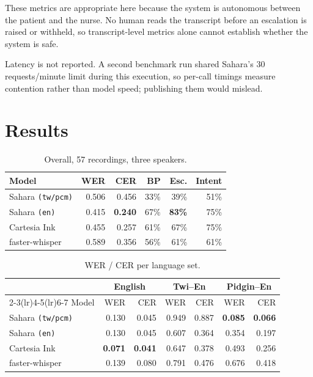 \documentclass[a4paper,10pt,twocolumn]{article}
\begin{document}
These metrics are appropriate here because the system is autonomous between the
patient and the nurse. No human reads the transcript before an escalation is
raised or withheld, so transcript-level metrics alone cannot establish whether
the system is safe.

Latency is not reported. A second benchmark run shared Sahara's
30\,requests/minute limit during this execution, so per-call timings measure
contention rather than model speed; publishing them would mislead.

\section{Results}

\begin{table}[t]
\centering\small
\caption{Overall, 57 recordings, three speakers.}
\label{tab:overall}
\setlength{\tabcolsep}{4pt}
\begin{tabular}{@{}lrrrrr@{}}
\toprule
Model & WER & CER & BP & Esc. & Intent \\
\midrule
Sahara \texttt{(tw/pcm)} & 0.506 & 0.456 & 33\% & 39\% & 51\% \\
Sahara \texttt{(en)} & 0.415 & \textbf{0.240} & 67\% & \textbf{83\%} & 75\% \\
Cartesia Ink & 0.455 & 0.257 & 61\% & 67\% & 75\% \\
faster-whisper & 0.589 & 0.356 & 56\% & 61\% & 61\% \\
\bottomrule
\end{tabular}
\end{table}

\begin{table}[t]
\centering\small
\caption{WER / CER per language set.}
\label{tab:wercer}
\setlength{\tabcolsep}{3.2pt}
\begin{tabular}{@{}lrrrrrr@{}}
\toprule
& \multicolumn{2}{c}{English} & \multicolumn{2}{c}{Twi--En} & \multicolumn{2}{c}{Pidgin--En} \\
\cmidrule(lr){2-3}\cmidrule(lr){4-5}\cmidrule(lr){6-7}
Model & WER & CER & WER & CER & WER & CER \\
\midrule
Sahara \texttt{(tw/pcm)} & 0.130 & 0.045 & 0.949 & 0.887 & \textbf{0.085} & \textbf{0.066} \\
Sahara \texttt{(en)} & 0.130 & 0.045 & 0.607 & 0.364 & 0.354 & 0.197 \\
Cartesia Ink & \textbf{0.071} & \textbf{0.041} & 0.647 & 0.378 & 0.493 & 0.256 \\
faster-whisper & 0.139 & 0.080 & 0.791 & 0.476 & 0.676 & 0.418 \\
\bottomrule
\end{tabular}
\end{table}
\end{document}
